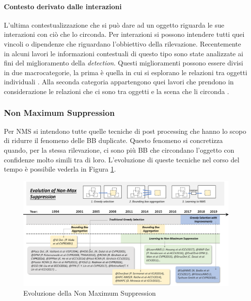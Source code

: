 \paragraph{Contesto derivato dalle interazioni}
L'ultima contestualizzazione che si può dare ad un oggetto riguarda le sue interazioni con ciò che lo circonda. Per interazioni si possono intendere tutti quei vincoli o dipendenze che riguardano l'obbiettivo della rilevazione. Recentemente in alcuni lavori le informazioni contestuali di questo tipo sono state analizzate ai fini del miglioramento della \textit{detection}. Questi miglioramenti possono essere divisi in due macrocategorie, la prima è quella in cui si esplorano le relazioni tra oggetti individuali \cite{felzenszwalb2009object, desai2011discriminative, song2011contextualizing, chen2017spatial, hu2018relation}. Alla seconda categoria appartengono quei lavori che prendono in considerazione le relazioni che ci sono tra oggetti e la scena che li circonda  \cite{gupta2015exploring, liu2018structure}.

\subsubsection{Non Maximum Suppression}
Per \ac{NMS} si intendono tutte quelle tecniche di post processing che hanno lo scopo di ridurre il fenomeno delle \ac{BB} duplicate. Questo fenomeno si concretizza quando, per la stessa rilevazione, ci sono più \ac{BB} che circondano l'oggetto con confidenze molto simili tra di loro. L'evoluzione di queste tecniche nel corso del tempo è possibile vederla in Figura \ref{fig:NMS_history}. 
\begin{figure}
    \centering
    \includegraphics[width=\textwidth]{images/evol-nms.png}
    \caption{Evoluzione della Non Maximum Suppression \cite{DBLP:journals/corr/abs-1905-05055}}
    \label{fig:NMS_history}
\end{figure}


